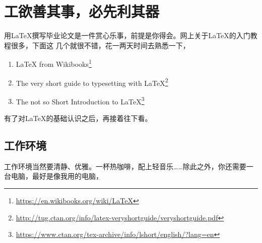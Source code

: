 \chapter{工欲善其事，必先利其器}
\label{cha:pre-requisite}

用\LaTeX{}撰写毕业论文是一件赏心乐事，前提是你得会。网上关于\LaTeX{}的入门教程很多，下面这
几个就很不错，花一两天时间去熟悉一下，

\begin{enumerate}
\item \LaTeX{} from Wikibooks\footnote{\url{https://en.wikibooks.org/wiki/LaTeX}}
\item The very short guide to typesetting with
  \LaTeX{}\footnote{\url{http://tug.ctan.org/info/latex-veryshortguide/veryshortguide.pdf}}
\item The not so Short Introduction to
  \LaTeX{}\footnote{\url{https://www.ctan.org/tex-archive/info/lshort/english/?lang=en}}
\end{enumerate}
有了对\LaTeX{}的基础认识之后，再接着往下看。

\section{工作环境}
\label{sec:env}

工作环境当然要清静、优雅。一杯热咖啡，配上轻音乐……除此之外，你还需要一台电脑，最好是像我用的电脑，

